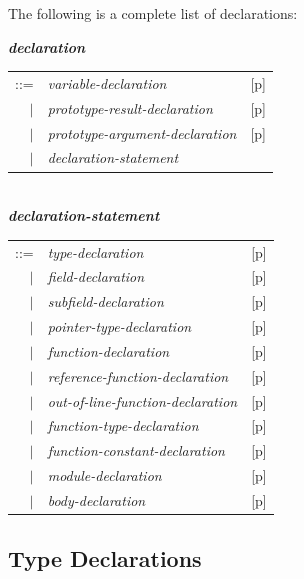 \documentclass[12pt]{article}
\newcommand{\emkey}[1]{{\em \bfseries #1}}
\newcommand{\pagref}[1]{p\pageref{#1}}
\newenvironment{indpar}[1][0.3in]%
	{\begin{list}{}%
		     {\setlength{\itemsep}{0in}%
		      \setlength{\topsep}{0in}%
		      \setlength{\parsep}{1ex}%
		      \setlength{\labelwidth}{#1}%
		      \setlength{\leftmargin}{#1}%
		      \addtolength{\leftmargin}{\labelsep}}%
	 \item}%
	{\end{list}}
\begin{document}
The following is a complete list of declarations:
\begin{indpar}
\emkey{declaration}\label{DECLARATION}
    \begin{tabular}[t]{@{}rll}
    ::= & {\em variable-declaration}
        & [\pagref{VARIABLE-DECLARATION}] \\
    $|$ & {\em prototype-result-declaration}
        & [\pagref{PROTOTYPE-RESULT-DECLARATION}] \\
    $|$ & {\em prototype-argument-declaration}
        & [\pagref{PROTOTYPE-ARGUMENT-DECLARATION}] \\
    $|$ & {\em declaration-statement} \\
    \end{tabular}
\\[0.5ex]
\emkey{declaration-statement}\label{DECLARATION-STATEMENT}
    \begin{tabular}[t]{@{}rll}
    ::= & {\em type-declaration}
        & [\pagref{TYPE-DECLARATIONS}] \\
    $|$ & {\em field-declaration}
        & [\pagref{FIELD-DECLARATION}] \\
    $|$ & {\em subfield-declaration}
        & [\pagref{SUBFIELD-DECLARATION}] \\
    $|$ & {\em pointer-type-declaration}
        & [\pagref{POINTER-TYPE-DECLARATIONS}] \\
    $|$ & {\em function-declaration}
        & [\pagref{FUNCTION-DECLARATION}] \\
    $|$ & {\em reference-function-declaration}
        & [\pagref{REFERENCE-FUNCTION-DECLARATIONS}] \\
    $|$ & {\em out-of-line-function-declaration}
        & [\pagref{OUT-OF-LINE-FUNCTION-DECLARATIONS}] \\
    $|$ & {\em function-type-declaration}
        & [\pagref{FUNCTION-TYPE-DECLARATION}] \\
    $|$ & {\em function-constant-declaration}
        & [\pagref{FUNCTION-CONSTANT-DECLARATION}] \\
    $|$ & {\em module-declaration}
        & [\pagref{MODULE-DECLARATION}] \\
    $|$ & {\em body-declaration}
        & [\pagref{BODY-DECLARATION}] \\
    \end{tabular}
\end{indpar}


\subsection{Type Declarations}
\label{TYPE-DECLARATIONS}
\end{document}
